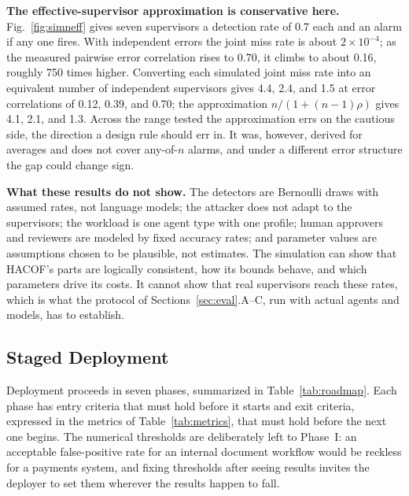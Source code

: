 \documentclass{ieeeaccess}
\newcommand{\hacof}{HACOF}
\begin{document}
\textbf{The effective-supervisor approximation is conservative here.} Fig.~\ref{fig:simneff} gives seven supervisors a detection rate of 0.7 each and an alarm if any one fires. With independent errors the joint miss rate is about $2\times10^{-4}$; as the measured pairwise error correlation rises to 0.70, it climbs to about 0.16, roughly 750 times higher. Converting each simulated joint miss rate into an equivalent number of independent supervisors gives 4.4, 2.4, and 1.5 at error correlations of 0.12, 0.39, and 0.70; the approximation $n/(1+(n-1)\rho)$ gives 4.1, 2.1, and 1.3. Across the range tested the approximation errs on the cautious side, the direction a design rule should err in. It was, however, derived for averages and does not cover any-of-$n$ alarms, and under a different error structure the gap could change sign.

\textbf{What these results do not show.} The detectors are Bernoulli draws with assumed rates, not language models; the attacker does not adapt to the supervisors; the workload is one agent type with one profile; human approvers and reviewers are modeled by fixed accuracy rates; and parameter values are assumptions chosen to be plausible, not estimates. The simulation can show that \hacof{}'s parts are logically consistent, how its bounds behave, and which parameters drive its costs. It cannot show that real supervisors reach these rates, which is what the protocol of Sections~\ref{sec:eval}.A--C, run with actual agents and models, has to establish.

\subsection{Staged Deployment}
\label{sec:eval-roadmap}

Deployment proceeds in seven phases, summarized in Table~\ref{tab:roadmap}. Each phase has entry criteria that must hold before it starts and exit criteria, expressed in the metrics of Table~\ref{tab:metrics}, that must hold before the next one begins. The numerical thresholds are deliberately left to Phase~I: an acceptable false-positive rate for an internal document workflow would be reckless for a payments system, and fixing thresholds after seeing results invites the deployer to set them wherever the results happen to fall.
\end{document}
